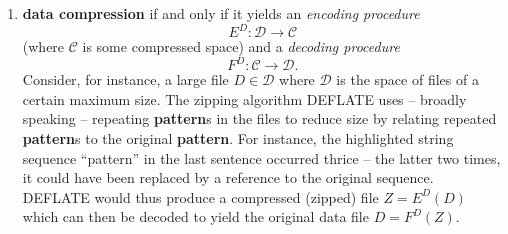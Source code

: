 \documentclass[]{report}
\theoremstyle{definition}
\theoremstyle{definition}
\theoremstyle{definition}
\theoremstyle{remark}
\begin{document}
\begin{enumerate}
\def\labelenumi{\alph{enumi})}
\item
  \textbf{data compression} if and only if it yields an \emph{encoding
  procedure} \[E^D:\mathcal{D}\to\mathcal{C}\] (where \(\mathcal{C}\) is
  some compressed space) and a \emph{decoding procedure}
  \[F^D:\mathcal{C}\to\mathcal{D}.\] Consider, for instance, a large
  file \(D\in\mathcal{D}\) where \(\mathcal{D}\) is the space of files
  of a certain maximum size. The zipping algorithm DEFLATE uses --
  broadly speaking -- repeating \textbf{pattern}s in the files to reduce
  size by relating repeated \textbf{pattern}s to the original
  \textbf{pattern}. For instance, the highlighted string sequence
  ``pattern'' in the last sentence occurred thrice -- the latter two
  times, it could have been replaced by a reference to the original
  sequence. DEFLATE would thus produce a compressed (zipped) file
  \(Z=E^D(D)\) which can then be decoded to yield the original data file
  \(D = F^D(Z)\). \citep[see][]{Group1996}


\end{enumerate}
\end{document}

